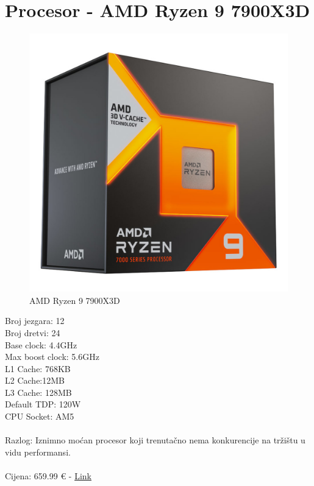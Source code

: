 \documentclass{report}
\begin{document}
\section{Procesor - AMD Ryzen 9 7900X3D}
\begin{figure}[H]
    \centering
    \includegraphics[scale=0.1]{Slike/7900x3d.jpg}
    \caption{AMD Ryzen 9 7900X3D}
    \label{fig:Procesor}
\end{figure}
Broj jezgara: 12\\Broj dretvi: 24\\Base clock: 4.4GHz\\Max boost clock: 5.6GHz\\L1 Cache: 768KB\\L2 Cache:12MB\\L3 Cache:    128MB\\Default TDP: 120W\\CPU Socket: AM5\\ \\Razlog: Iznimno moćan procesor koji trenutačno nema konkurencije na tržištu u vidu performansi.\\\\Cijena: 659.99 € - \href{https://www.links.hr/hr/procesor-amd-ryzen-9-7900x3d-box-s-am5-4-4ghz-128mb-cache-12-core-bez-hladnjaka-010501030}{Link}

\pagebreak
\end{document}
